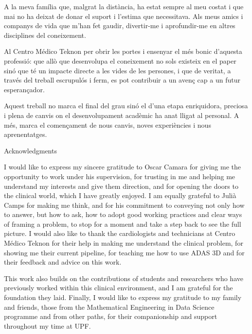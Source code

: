 \cleardoublepage

{\fontsize{12}{14}\selectfont
A la meva fam\'{i}lia que, malgrat la dist\`{a}ncia, ha estat sempre al meu costat i que mai no ha
deixat de donar el suport i l'estima que necessitava. Als meus amics i companys de vida
que m'han fet gaudir, divertir-me i aprofundir-me en altres disciplines del coneixement.

Al Centro M\'{e}dico Teknon per obrir les portes i ensenyar el m\'{e}s bonic d'aquesta
professi\'{o}: que all\`{o} que desenvolupa el coneixement no sols existeix en el paper sin\'{o} que
t\'{e} un impacte directe a les vides de les persones, i que de veritat, a trav\'{e}s del treball
escrupul\'{o}s i ferm, es pot contribuir a un aven\c{c} cap a un futur esperan\c{c}ador.

Aquest treball no marca el final del grau sin\'{o} el d'una etapa enriquidora, preciosa i plena
de canvis on el desenvolupament acad\`{e}mic ha anat lligat al personal. A m\'{e}s, marca el
comen\c{c}ament de nous canvis, noves experi\`{e}ncies i nous aprenentatges.
}

\cleardoublepage

{\Large \sffamily Acknowledgments}

\vspace{0.5em}

{\fontsize{11}{13.5}\selectfont
\noindent
I would like to express my sincere gratitude to Oscar Camara for giving me the opportunity
to work under his supervision, for trusting in me and helping me understand my interests
and give them direction, and for opening the doors to the clinical world, which I have
greatly enjoyed. I am equally grateful to Juli\`{a} Camps for making me think, and for his
commitment to conveying not only how to answer, but how to ask, how to adopt good
working practices and clear ways of framing a problem, to stop for a moment and take a
step back to see the full picture. I would also like to thank the cardiologists and
technicians at Centro M\'{e}dico Teknon for their help in making me understand the clinical
problem, for showing me their current pipeline, for teaching me how to use ADAS 3D and
for their feedback and advice on this work.

This work also builds on the contributions of students and researchers who have previously
worked within this clinical environment, and I am grateful for the foundation they laid.
Finally, I would like to express my gratitude to my family and friends, those from the
Mathematical Engineering in Data Science programme and from other paths, for their
companionship and support throughout my time at UPF.
}

